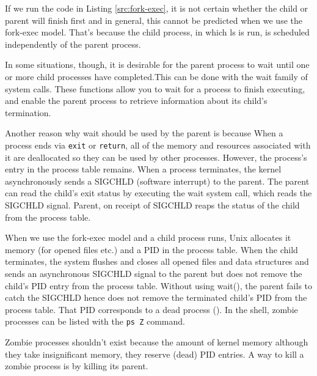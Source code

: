 \documentclass[a4paper]{article}
\begin{document}
If we run the code in Listing \ref{src:fork-exec}, it is not certain whether the child or parent will finish first and in general, this cannot be predicted when we use the fork-exec model. That’s because the child process, in which ls is run, is scheduled independently of the parent process.

In some situations, though, it is desirable for the parent process to wait until one or
more child processes have completed.This can be done with the wait family of system
calls. These functions allow you to wait for a process to finish executing, and enable
the parent process to retrieve information about its child’s termination.

Another reason why wait should be used by the parent is because When a process ends via \texttt{exit} or \texttt{return}, all of the memory and resources associated with it are deallocated so they can be used by other processes. However, the process's entry in the process table remains. When a process terminates, the kernel asynchronously sends a SIGCHLD  (software interrupt) to the parent. The parent can read the child's exit status by executing the wait system call, which reads the SIGCHLD signal. Parent, on receipt of SIGCHLD reaps the status of the child from the process table.

When we use the fork-exec model and a child process runs, Unix allocates it memory (for opened files etc.) and a PID in the process table. When the child terminates, the system flushes and closes all opened files and data structures and sends an asynchronous SIGCHLD signal to the parent but does not remove the child's PID entry from the process table. Without using wait(), the parent fails to catch the SIGCHLD hence does not remove the terminated child's PID from the process table. That PID corresponds to a dead process (). In the shell, zombie processes can be listed with the \texttt{ps Z} command.

Zombie processes shouldn't exist because the amount of kernel memory although they take insignificant memory, they reserve (dead) PID entries. A way to kill a zombie process is by killing its parent. 
\end{document}
